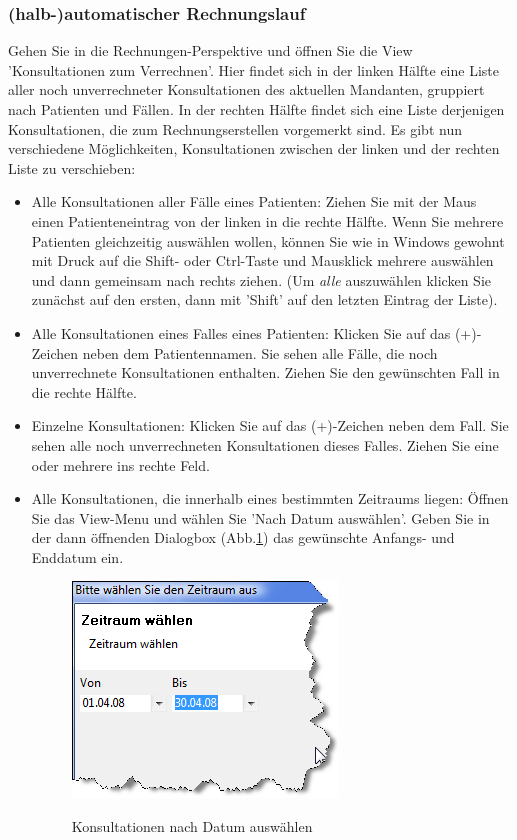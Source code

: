 \documentclass[a4paper]{scrartcl}
\begin{document}
\subsubsection{(halb-)automatischer Rechnungslauf}
Gehen Sie in die Rechnungen-Perspektive und öffnen Sie die View 'Konsultationen zum Verrechnen'. Hier findet sich in der linken Hälfte eine Liste aller noch unverrechneter Konsultationen des aktuellen Mandanten, gruppiert nach Patienten und Fällen. In der rechten Hälfte findet sich eine Liste derjenigen Konsultationen, die zum Rechnungserstellen vorgemerkt sind. Es gibt nun verschiedene Möglichkeiten, Konsultationen zwischen der linken und der rechten Liste zu verschieben:
\begin{itemize}
\item Alle Konsultationen aller Fälle eines Patienten: Ziehen Sie mit der Maus einen Patienteneintrag von der linken in die rechte Hälfte. Wenn Sie mehrere Patienten gleichzeitig auswählen wollen, können Sie wie in Windows gewohnt mit Druck auf die Shift- oder Ctrl-Taste und Mausklick mehrere auswählen und dann gemeinsam nach rechts ziehen. (Um \textit{alle} auszuwählen klicken Sie zunächst auf den ersten, dann mit 'Shift' auf den letzten Eintrag der Liste).
\item Alle Konsultationen eines Falles eines Patienten: Klicken Sie auf das (+)-Zeichen neben dem Patientennamen. Sie sehen alle Fälle, die noch unverrechnete Konsultationen enthalten. Ziehen Sie den gewünschten Fall in die rechte Hälfte.
\item Einzelne Konsultationen: Klicken Sie auf das (+)-Zeichen neben dem Fall. Sie sehen alle noch unverrechneten Konsultationen dieses Falles. Ziehen Sie eine oder mehrere ins rechte Feld.
\item Alle Konsultationen, die innerhalb eines bestimmten Zeitraums liegen: Öffnen Sie das View-Menu und wählen Sie 'Nach Datum auswählen'. Geben Sie in der dann öffnenden Dialogbox (Abb.\ref{fig:abr10}) das gewünschte Anfangs- und Enddatum ein.
\begin{figure}
  \includegraphics{abr10}\\
  \caption{Konsultationen nach Datum auswählen}\label{fig:abr10}
\end{figure}


\end{itemize}
\end{document}
